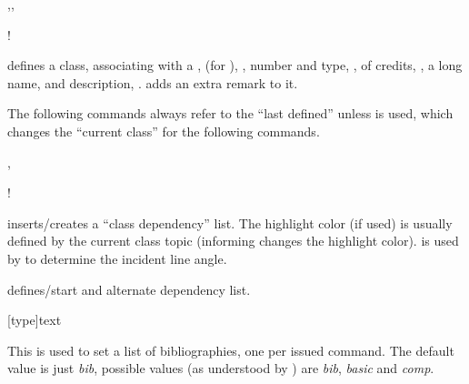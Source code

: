 \documentclass[dctools,english]{ufrgscca} %
\begin{document}
\begin{Macros}{\classdef,\setclass,\classremark}
    \begin{Syntax}%
        \Macro!{\classdef}{}
    \end{Syntax}
\Macro{\classdef}{} defines a class, associating with a ,  (for ), , number and type, , of credits, , a long name,  and description, . \Macro{\classremark}{} adds an extra remark to it.

The following commands always refer to the “last defined” \Macro{\classdef}{} unless \Macro{\setclass}{} is used, which changes the “current class” for the following commands.
\end{Macros}

\begin{Macros}{\depdef,\altdef}
    \begin{Syntax}%
        \Macro!{\depdef}{}
        \Macro{\altdef}{}
    \end{Syntax}
\Macro{\depdef}{} inserts/creates a “class dependency” list. The highlight color (if used) is usually defined by the current class topic (informing  changes the highlight color).  is used by  to determine the incident line angle.

\Macro{\altdef}{} defines/start and alternate dependency list.
\end{Macros}

\begin{Macros}{\bibdef}
    \begin{Syntax}%
        \Macro{\bibdef}[type]{text}
    \end{Syntax}
This is used to set a list of bibliographies, one per issued command. The default  value is just \emph{bib}, possible values (as understood by ) are \emph{bib}, \emph{basic} and \emph{comp}.
\end{Macros}
\end{document}
